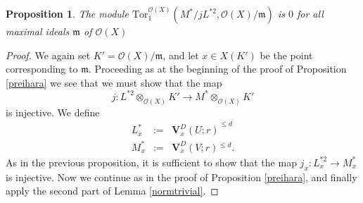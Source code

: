 \documentclass[a4paper, notitlepage]{amsart}
\newcommand{\m}{\ensuremath{\mathfrak{m}}\xspace}
\newcommand{\M}{\ensuremath{\mathfrak{M}}\xspace}
\newcommand{\OO}{\ensuremath{\mathscr{O}}\xspace}
\newtheorem{proposition}[theorem]{Proposition}
\newcommand{\OCdS}{\ensuremath{\mathbf{V}^D_{x}(U;r)}\xspace}
\newcommand{\OCVSd}{\ensuremath{\mathbf{V}^D_{x}(V;r)}\xspace}
\newcommand{\s}{\ensuremath{^{\leq d}}\xspace}
\begin{document}
\begin{proposition}\label{preiharadual}
The module $\mathrm{Tor}_1^{\OO(X)}(M^*/jL^{*2},\OO(X)/\m)$ is $0$ for all maximal ideals $\m$ of $\OO(X)$
\end{proposition}
\begin{proof}
We again set $K'=\OO(X)/\m$, and let $x \in X(K')$ be the point corresponding to $\m$. Proceeding as at the beginning of the proof of Proposition \ref{preihara} we see that we must show that the map $$j:L^{*2}\otimes_{\OO(X)}K' \rightarrow M^*\otimes_{\OO(X)}K'$$ is injective. 
We define \begin{eqnarray*}L^{*}_x&:=&\OCdS^{\leq d} \\M^*_x&:=&\OCVSd\s.\end{eqnarray*}
As in the previous proposition, it is sufficient to show that the map $j_x:L_x^{*2} \rightarrow M^*_x$ is injective. Now we continue as in the proof of Proposition \ref{preihara}, and finally apply the second part of Lemma \ref{normtrivial}.
\end{proof}
\end{document}
